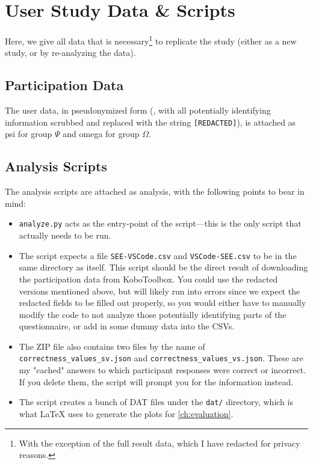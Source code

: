 \section{User Study Data \& Scripts}\label{app:scripts}
Here, we give all data that is necessary\footnote{
	With the exception of the full result data, which I have redacted for privacy reasons.
} to replicate the study (either as a new study, or by re-analyzing the data).

\subsection{Participation Data}
The user data, in pseudonymized form (\ie, with all potentially identifying information scrubbed and replaced with the string \texttt{[REDACTED]}), is attached as \gls{psi} for group $\Psi$ and \gls{omega} for group $\Omega$.

\subsection{Analysis Scripts}
The analysis scripts are attached as \gls{analysis}, with the following points to bear in mind:
\begin{itemize}
	\item \texttt{analyze.py} acts as the entry-point of the script---this is the only script that actually needs to be run.
	\item The script expects a file \texttt{SEE-VSCode.csv} and \texttt{VSCode-SEE.csv} to be in the same directory as itself.
	      This script should be the direct result of downloading the participation data from KoboToolbox.
	      You could use the redacted versions mentioned above, but will likely run into errors since we expect the redacted fields to be filled out properly, so you would either have to manually modify the code to not analyze those potentially identifying parts of the questionnaire, or add in some dummy data into the CSVs.
	\item The ZIP file also contains two files by the name of \texttt{correctness\_values\_sv.json} and \texttt{correctness\_values\_vs.json}.
	      These are my "cached" answers to which participant responses were correct or incorrect.
	      If you delete them, the script will prompt you for the information instead.
	\item The script creates a bunch of DAT files under the \texttt{dat/} directory, which is what \LaTeX{} uses to generate the plots for \cref{ch:evaluation}.
\end{itemize}

